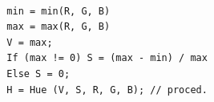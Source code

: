 \begin{definition} \
  \vspace{-8pt}
  \lstset{basicstyle=\ttfamily\footnotesize,breaklines=true}
  \begin{center}
    \begin{lstlisting}
  min = min(R, G, B)
  max = max(R, G, B)
  V = max;
  If (max != 0) S = (max - min) / max
  Else S = 0;
  H = Hue (V, S, R, G, B); // proced.
    \end{lstlisting}
  \end{center}
\end{definition}
